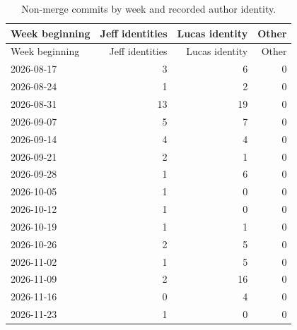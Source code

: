 \begin{longtable}{lrrr}
\caption{Non-merge commits by week and recorded author identity.}\\
\toprule Week beginning & Jeff identities & Lucas identity & Other\\\midrule\endfirsthead
\toprule Week beginning & Jeff identities & Lucas identity & Other\\\midrule\endhead
2026-08-17 & 3 & 6 & 0\\
2026-08-24 & 1 & 2 & 0\\
2026-08-31 & 13 & 19 & 0\\
2026-09-07 & 5 & 7 & 0\\
2026-09-14 & 4 & 4 & 0\\
2026-09-21 & 2 & 1 & 0\\
2026-09-28 & 1 & 6 & 0\\
2026-10-05 & 1 & 0 & 0\\
2026-10-12 & 1 & 0 & 0\\
2026-10-19 & 1 & 1 & 0\\
2026-10-26 & 2 & 5 & 0\\
2026-11-02 & 1 & 5 & 0\\
2026-11-09 & 2 & 16 & 0\\
2026-11-16 & 0 & 4 & 0\\
2026-11-23 & 1 & 0 & 0\\
\bottomrule\end{longtable}
